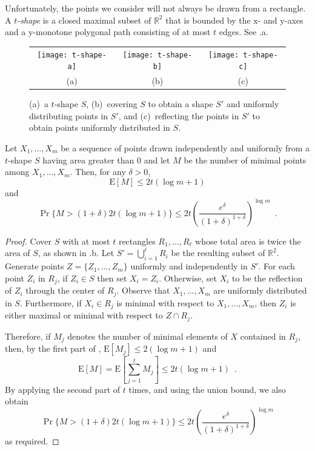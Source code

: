 \documentclass[10pt]{llncs}
\newcommand{\RR}{\mathbb{R}}
\newcommand{\PROB}{\Pr}
\newcommand{\EXP}{\mathrm{E}}
\begin{document}
Unfortunately, the points we consider will not always be drawn from a
rectangle.  A \emph{$t$-shape} is a closed maximal subset of $\RR^2$ that
is bounded by the $\mathrm x$- and $\mathrm y$-axes and a $\mathrm
y$-monotone polygonal path consisting of at most $t$ edges.  See
.a.

\begin{figure}
  \begin{center}
    \begin{tabular}{ccc}
      \texttt{[image: t-shape-a]} & 
      \texttt{[image: t-shape-b]} & 
      \texttt{[image: t-shape-c]} \\
      (a) & (b) & (c)
    \end{tabular}
  \end{center}
  \caption{(a)~a $t$-shape $S$, (b)~covering $S$ to obtain a shape $S'$ and
uniformly distributing points in $S'$, and (c)~reflecting the points in
$S'$ to obtain points uniformly distributed in $S$.}
\end{figure}

\begin{lem}
  Let $X_1,\ldots,X_m$ be a sequence of points drawn independently and
  uniformly from a $t$-shape $S$ having area greater than
  0 and let $M$ be the number of minimal points
  among $X_1,\ldots,X_m$.  Then, for any $\delta >0$,
  \begin{equation}
    \EXP[M] \le 2t(\log m + 1)
  \end{equation}
  and 
  \begin{equation}
    \PROB\{M>(1+\delta)2t(\log m+1)\} 
        \le 2t\left(\frac{e^\delta}{(1+\delta)^{1+\delta}}\right)^{\log m} 
	\enspace .
  \end{equation}
\end{lem}

\begin{proof}
Cover $S$ with at most $t$ rectangles $R_1,\ldots,R_\ell$ whose total area
is twice the area of $S$, as shown in .b.  Let
$S'=\bigcup_{i=1}^\ell R_i$ be the resulting subset of $\RR^2$.  Generate
points $Z=\{Z_1,\ldots,Z_m\}$ uniformly and independently in $S'$.  For each
point $Z_i$ in $R_j$, if $Z_i\in S$ then set $X_i=Z_i$.  Otherwise, set
$X_i$ to be the reflection of $Z_i$ through the center of $R_j$.  Observe
that $X_1,\ldots,X_m$ are uniformly distributed in $S$.  Furthermore, if
$X_i\in R_j$ is minimal with respect to $X_1,\ldots,X_m$, then $Z_i$ is either
maximal or minimal with respect to $Z \cap R_j$.

Therefore, if $M_j$ denotes the number of minimal elements of $X$ contained
in $R_j$, then, by the first part of , $\EXP[M_j]\le
2(\log m+1)$ and 
\[
     \EXP[M] = \EXP\left[\sum_{j=1}^t M_j\right] \le 2t(\log m + 1)
     \enspace .
\]
By applying the second part of  $t$ times,
and using the union bound, we also obtain
\[
    \PROB\{M>(1+\delta)2t(\log m+1)\} 
        \le 2t\left(\frac{e^\delta}{(1+\delta)^{1+\delta}}\right)^{\log m} 
\]
as required.
\end{proof}
\end{document}
